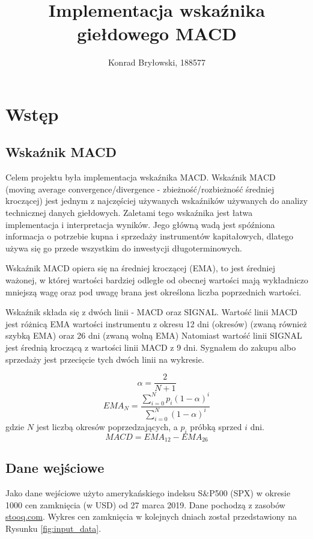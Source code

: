 \documentclass{article}
\title{Implementacja wskaźnika giełdowego MACD}
\author{Konrad Bryłowski, 188577}
\begin{document}
\maketitle

\section{Wstęp}

\subsection{Wskaźnik MACD}

Celem projektu była implementacja wskaźnika MACD. Wskaźnik MACD (moving average convergence/divergence - zbieżność/rozbieżność średniej kroczącej) jest jednym z najczęściej używanych wskaźników używanych do analizy technicznej danych giełdowych. Zaletami tego wskaźnika jest łatwa implementacja i interpretacja wyników. Jego główną wadą jest spóźniona informacja o potrzebie kupna i sprzedaży instrumentów kapitałowych, dlatego używa się go przede wszystkim do inwestycji długoterminowych.

Wskaźnik MACD opiera się na średniej kroczącej (EMA), to jest średniej ważonej, w której wartości bardziej odległe od obecnej wartości mają wykładniczo mniejszą wagę oraz pod uwagę brana jest określona liczba poprzednich wartości.

Wskaźnik składa się z dwóch linii - MACD oraz SIGNAL. Wartość linii MACD jest różnicą EMA wartości instrumentu z okresu 12 dni (okresów) (zwaną również szybką EMA) oraz 26 dni (zwaną wolną EMA) \cite{web:wiki} Natomiast wartość linii SIGNAL jest średnią kroczącą z wartości linii MACD z 9 dni. Sygnałem do zakupu albo sprzedaży jest przecięcie tych dwóch linii na wykresie.

\[\alpha = \frac{2}{N + 1}\]
\[EMA_N = \frac{\sum_{i = 0}^N p_i (1 - \alpha)^i}{\sum_{i = 0}^N(1-\alpha)^i}\]
gdzie $N$ jest liczbą okresów poprzedzających, a $p_i$ próbką sprzed $i$ dni.
\[MACD = EMA_{12} - EMA_{26}\]

\subsection{Dane wejściowe}

Jako dane wejściowe użyto amerykańskiego indeksu S\&P500 (SPX) w okresie 1000 cen zamknięcia (w USD) od 27 marca 2019. Dane pochodzą z zasobów \href{https://stooq.com/q/d/?s=^spx&c=0&d1=20190325&d2=20230315}{stooq.com}. Wykres cen zamknięcia w kolejnych dniach został przedstawiony na Rysunku \ref{fig:input_data}.
\end{document}
